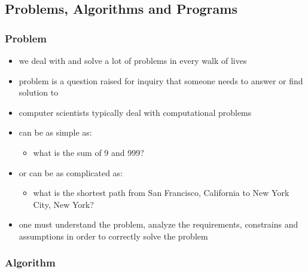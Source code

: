 \documentclass[11pt]{article}
\providecommand{\tightlist}{%
      \setlength{\itemsep}{0pt}\setlength{\parskip}{0pt}}
\begin{document}
    \hypertarget{problems-algorithms-and-programs}{%
\subsection{Problems, Algorithms and
Programs}\label{problems-algorithms-and-programs}}

\hypertarget{problem}{%
\subsubsection{Problem}\label{problem}}

\begin{itemize}
\tightlist
\item
  we deal with and solve a lot of problems in every walk of lives
\item
  problem is a question raised for inquiry that someone needs to answer
  or find solution to
\item
  computer scientists typically deal with computational problems
\item
  can be as simple as:

  \begin{itemize}
  \tightlist
  \item
    what is the sum of 9 and 999?
  \end{itemize}
\item
  or can be as complicated as:

  \begin{itemize}
  \tightlist
  \item
    what is the shortest path from San Francisco, California to New York
    City, New York?
  \end{itemize}
\item
  one must understand the problem, analyze the requirements, constrains
  and assumptions in order to correctly solve the problem
\end{itemize}

    \hypertarget{algorithm}{%
\subsubsection{Algorithm}\label{algorithm}}
\end{document}
